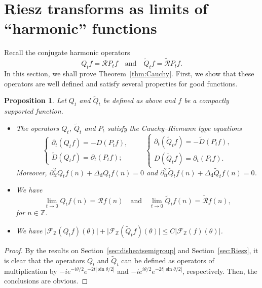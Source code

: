 \documentclass[11pt]{amsart}
\numberwithin{equation}{section}
\newcommand{\Z}{\mathbb{Z}}
\newcommand{\dis}{\mathrm{d}}
\theoremstyle{plain}
\newtheorem{prop}{Proposition}
\theoremstyle{remark}
\begin{document}
\section{Riesz transforms as limits of ``harmonic'' functions}
\label{sec:Cauchy}

Recall the conjugate harmonic operators
\[
Q_t f= \mathcal{R}  P_t f  \quad\text{and}\quad  \widetilde{Q}_tf = \widetilde{\mathcal{R}}P_t f.
\]
In this section, we shall prove Theorem~\ref{thm:Cauchy}. First, we show that these operators are well defined and satisfy several properties for good functions.

\begin{prop} Let $Q_t$ and $\widetilde{Q}_t$ be defined as above and $f$ be a compactly supported function.
\begin{itemize}
\item[(i)] The operators $Q_t$, $\widetilde{Q}_t$ and $P_t$ satisfy the Cauchy--Riemann type equations
\[
\begin{cases}
\partial_t(Q_tf) = -D(P_tf), \\
 \widetilde{D}(Q_tf) = \partial_t(P_tf);
\end{cases}
\quad \quad\begin{cases}
\partial_t(\widetilde{Q}_tf)
= -\widetilde{D}(P_tf),\\
 D(\widetilde{Q}_tf) = \partial_t(P_tf).
\end{cases}
\]
Moreover, $\partial^2_{tt} Q_tf(n) + \Delta_{\dis} Q_tf(n) =0$
and $\partial^2_{tt} \widetilde{Q}_tf(n)  + \Delta_{\dis} \widetilde{Q}_tf(n) =0$.
\item[(ii)] We have
\[
\lim_{t\to 0} Q_tf(n) = \mathcal{R} f(n) \quad \text{and}\quad \lim_{t\to 0} \widetilde{Q}_tf(n) = \widetilde{\mathcal{R}} f(n),
\]
for $n \in \mathbb{Z}$.

\item[(iii)] We have $\big| \mathcal{F}_{\Z}(Q_t f)(\theta) \big | + \big| \mathcal{F}_{\Z}(\widetilde{Q}_t f)(\theta) \big | \le C | \mathcal{F}_{\Z}(f)(\theta)|$.
\end{itemize}
\end{prop}
\begin{proof}
By the results on Section~\ref{sec:disheatsemigroup} and Section~\ref{sec:Riesz}, it is clear that the operators $Q_t$ and $\widetilde{Q}_t$ can be defined as operators of multiplication by $-ie^{-i\theta/2}e^{-2t|\sin \theta/2|}$ and $-ie^{i\theta/2}e^{-2t|\sin \theta/2|}$, respectively. Then, the conclusions are obvious.
\end{proof}
\end{document}
